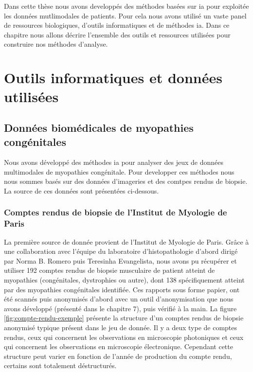 Dans cette thèse nous avons developpés des méthodes basées sur \gls{ia} pour exploitée les données mutlimodales de patients. Pour cela nous avons utilisé un vaste panel de ressources biologiques, d'outils informatiques et de méthodes \gls{ia}. Dans ce chapitre nous allons décrire l'ensemble des outils et ressources utilisées pour construire nos méthodes d'analyse.

\chapter{Outils informatiques et données utilisées}

\section{Données biomédicales de myopathies congénitales}
Nous avons développé des méthodes \gls{ia} pour analyser des jeux de données multimodales de myopathies congénitale. Pour developper ces méthodes nous nous sommes basés sur des données d'imageries et des comtpes rendus de biopsie. La source de ces données sont présentées ci-dessous.

\subsection{Comptes rendus de biopsie de l'Institut de Myologie de Paris}
La première source de donnée provient de l'Institut de Myologie de Paris. Grâce à une collaboration avec l'équipe du laboratoire d’histopathologie d'abord dirigé par Norma B. Romero puis Teresinha Evangelista, nous avons pu récupérer et utiliser 192 comptes rendus de biopsie musculaire de patient atteint de myopathies (congénitales, dystrophies ou autre), dont 138 spécifiquement atteint par des myopathies congénitales identifiée. Ces rapports sous forme papier, ont été scannés puis anonymisés d'abord avec un outil d'anonymisation que nous avons développé (présenté dans le chapitre 7), puis vérifié à la main. La figure \ref{fig:compte-rendu-exemple} présente la structure d'un comptes rendus de biopsie anonymisé typique présent dans le jeu de donnée. Il y a deux type de comptes rendus, ceux qui concernent les observations en microscopie photoniques et ceux qui concernent les observations en microscopie électronique. Cependant cette structure peut varier en fonction de l'année de production du compte rendu, certains sont totalement déstructurés.

